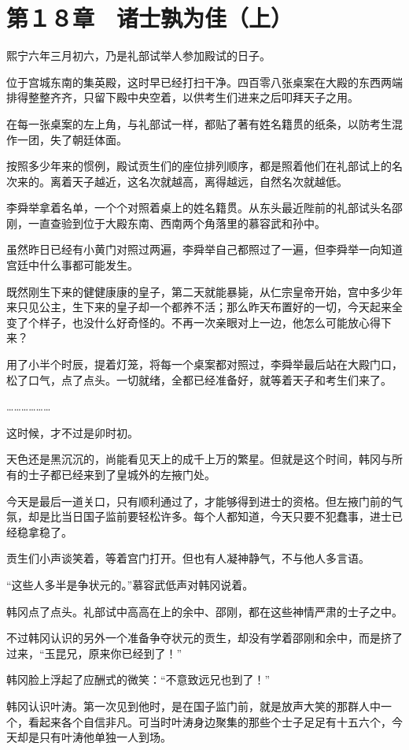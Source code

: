 \section{第１８章　诸士孰为佳（上）}

熙宁六年三月初六，乃是礼部试举人参加殿试的日子。

位于宫城东南的集英殿，这时早已经打扫干净。四百零八张桌案在大殿的东西两端排得整整齐齐，只留下殿中央空着，以供考生们进来之后叩拜天子之用。

在每一张桌案的左上角，与礼部试一样，都贴了著有姓名籍贯的纸条，以防考生混作一团，失了朝廷体面。

按照多少年来的惯例，殿试贡生们的座位排列顺序，都是照着他们在礼部试上的名次来的。离着天子越近，这名次就越高，离得越远，自然名次就越低。

李舜举拿着名单，一个个对照着桌上的姓名籍贯。从东头最近陛前的礼部试头名邵刚，一直查验到位于大殿东南、西南两个角落里的慕容武和孙中。

虽然昨日已经有小黄门对照过两遍，李舜举自己都照过了一遍，但李舜举一向知道宫廷中什么事都可能发生。

既然刚生下来的健健康康的皇子，第二天就能暴毙，从仁宗皇帝开始，宫中多少年来只见公主，生下来的皇子却一个都养不活；那么昨天布置好的一切，今天起来全变了个样子，也没什么好奇怪的。不再一次亲眼对上一边，他怎么可能放心得下来？

用了小半个时辰，提着灯笼，将每一个桌案都对照过，李舜举最后站在大殿门口，松了口气，点了点头。一切就绪，全都已经准备好，就等着天子和考生们来了。

………………

这时候，才不过是卯时初。

天色还是黑沉沉的，尚能看见天上的成千上万的繁星。但就是这个时间，韩冈与所有的士子都已经来到了皇城外的左掖门处。

今天是最后一道关口，只有顺利通过了，才能够得到进士的资格。但左掖门前的气氛，却是比当日国子监前要轻松许多。每个人都知道，今天只要不犯蠢事，进士已经稳拿稳了。

贡生们小声谈笑着，等着宫门打开。但也有人凝神静气，不与他人多言语。

“这些人多半是争状元的。”慕容武低声对韩冈说着。

韩冈点了点头。礼部试中高高在上的余中、邵刚，都在这些神情严肃的士子之中。

不过韩冈认识的另外一个准备争夺状元的贡生，却没有学着邵刚和余中，而是挤了过来，“玉昆兄，原来你已经到了！”

韩冈脸上浮起了应酬式的微笑：“不意致远兄也到了！”

韩冈认识叶涛。第一次见到他时，是在国子监门前，就是放声大笑的那群人中一个，看起来各个自信非凡。可当时叶涛身边聚集的那些个士子足足有十五六个，今天却是只有叶涛他单独一人到场。

